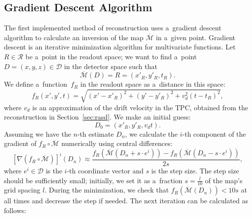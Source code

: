 			
		
		\subsection{Gradient Descent Algorithm}
		\label{sec:grad}			
			The first implemented method of reconstruction uses a~gradient descent algorithm to calculate an inversion of the map $\overline{\mathcal{M}}$ in a~given point. Gradient descent is an iterative minimization algorithm for multivariate functions. Let $R\in\mathcal{R}$ be a~point in the readout space; we want to find a~point $D = (x,y,z) \in\mathcal{D}$ in the detector space such that 
				\begin{equation}
					\overline{\mathcal{M}}(D) = R = (x'_R,y'_R,t_R).
				\end{equation}
			We define a~function~$f_R$ in the readout space as a~distance in this space:
				\begin{equation}
					f_R(x',y',t) = \sqrt{(x'-x'_R)^2+(y'-y'_R)^2+v_d^2(t-t_R)^2},
				\end{equation}
			where $v_d$ is an approximation of the drift velocity in the \ac{TPC}, obtained from the reconstruction in Section~\ref{sec:rasd}. We make an initial guess:
				\begin{equation}
					D_0 = (x'_R,y'_R,v_dt).
				\end{equation}
			Assuming we have the $n$-th estimate $D_n$, we calculate the $i$-th component of the gradient of $f_R\circ\overline{\mathcal{M}}$ numerically using central differences:
				\begin{equation}
					\left[\nabla(f_R\circ\overline{\mathcal{M}})\right]^i(D_n) \approx \frac{f_R(\overline{\mathcal{M}}(D_n+s\cdot e^i))-f_R(\overline{\mathcal{M}}(D_n-s\cdot e^i))}{2s},
				\end{equation}
			where $e^i\in\mathcal{D}$ is the $i$-th coordinate vector and $s$ is the step size. The step size should be sufficiently small; initially, we set it as a~fraction $s = \frac{l}{10}$ of the map's grid spacing $l$. During the minimization, we check that $f_R(\overline{\mathcal{M}}(D_n))<10s$ at all times and decrease the step if needed. The next iteration can be calculated as follows:
